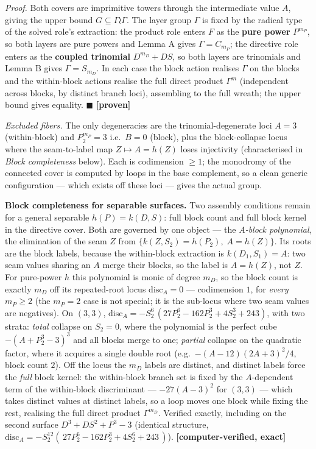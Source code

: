 \documentclass[11pt]{article}
\theoremstyle{plain}
\theoremstyle{definition}
\theoremstyle{remark}
\begin{document}
\emph{Proof.} Both covers are imprimitive towers through the intermediate value \(A\), giving the upper bound \(G\subseteq \Gamma\wr\Gamma\). The layer group \(\Gamma\) is fixed by the radical type of the solved role's extraction: the product role enters \(F\) as the \textbf{pure power} \(P^{m_P}\), so both layers are pure powers and Lemma A gives \(\Gamma = C_{m_P}\); the directive role enters as the \textbf{coupled trinomial} \(D^{m_D}+DS\), so both layers are trinomials and Lemma B gives \(\Gamma = S_{m_D}\). In each case the block action realises \(\Gamma\) on the blocks and the within-block actions realise the full direct product \(\Gamma^{m}\) (independent across blocks, by distinct branch loci), assembling to the full wreath; the upper bound gives equality. \(\blacksquare\) \textbf{{[}proven{]}}

\emph{Excluded fibers.} The only degeneracies are the trinomial-degenerate loci \(A = 3\) (within-block) and \(P_2^{m_P} = 3\) i.e.~\(B=0\) (block), plus the block-collapse locus where the seam-to-label map \(Z\mapsto A=h(Z)\) loses injectivity (characterised in \emph{Block completeness} below). Each is codimension \(\ge 1\); the monodromy of the connected cover is computed by loops in the base complement, so a clean generic configuration --- which exists off these loci --- gives the actual group.

\textbf{Block completeness for separable surfaces.} Two assembly conditions remain for a general separable \(h(P)=k(D,S)\): full block count and full block kernel in the directive cover. Both are governed by one object --- the \emph{\(A\)-block polynomial}, the elimination of the seam \(Z\) from \(\{k(Z,S_2)=h(P_2),\;A=h(Z)\}\). Its roots are the block labels, because the within-block extraction is \(k(D_1,S_1)=A\): two seam values sharing an \(A\) merge their blocks, so the label is \(A=h(Z)\), not \(Z\). For pure-power \(h\) this polynomial is monic of degree \(m_D\), so the block count is exactly \(m_D\) off its repeated-root locus \(\mathrm{disc}_A=0\) --- codimension \(1\), for \emph{every} \(m_P\ge2\) (the \(m_P=2\) case is not special; it is the sub-locus where two seam values are negatives). On \((3,3)\), \(\mathrm{disc}_A = -S_2^{6}\,(27P_2^6-162P_2^3+4S_2^3+243)\), with two strata: \emph{total} collapse on \(S_2=0\), where the polynomial is the perfect cube \(-(A+P_2^3-3)^3\) and all blocks merge to one; \emph{partial} collapse on the quadratic factor, where it acquires a single double root (e.g.~\(-(A-12)(2A+3)^2/4\), block count \(2\)). Off the locus the \(m_D\) labels are distinct, and distinct labels force the \emph{full} block kernel: the within-block branch set is fixed by the \(A\)-dependent term of the within-block discriminant --- \(-27(A-3)^2\) for \((3,3)\) --- which takes distinct values at distinct labels, so a loop moves one block while fixing the rest, realising the full direct product \(\Gamma^{m_D}\). Verified exactly, including on the second surface \(D^3+DS^2+P^3-3\) (identical structure, \(\mathrm{disc}_A=-S_2^{12}(\,27P_2^6-162P_2^3+4S_2^6+243\,)\)). \textbf{{[}computer-verified, exact{]}}
\end{document}
